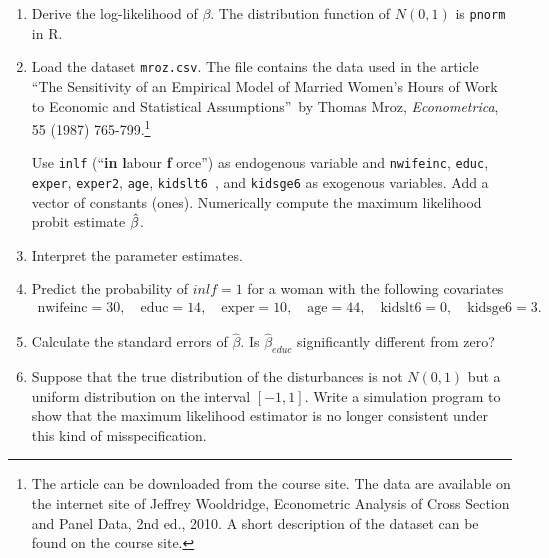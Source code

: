 \documentclass{article}
\begin{document}
\begin{enumerate}\setlength{\itemsep}{0pt}
\item Derive the log-likelihood of $\beta $. The distribution function of $%
N(0,1)$ is \texttt{pnorm} in R.

\item Load the dataset \texttt{mroz.csv}. The file contains the data used in
the article \textquotedblleft The Sensitivity of an Empirical Model of
Married Women's Hours of Work to Economic and Statistical
Assumptions\textquotedblright\ by Thomas Mroz, \emph{Econometrica}, 55
(1987) 765-799.\footnote{%
The article can be downloaded from the course site. The data are available
on the internet site of Jeffrey Wooldridge, Econometric Analysis of Cross
Section and Panel Data, 2nd ed., 2010. A short description of the dataset
can be found on the course site.}

Use \texttt{inlf} (\textquotedblleft \textbf{in} \textbf{l}abour \textbf{f}%
orce\textquotedblright ) as endogenous variable and \texttt{nwifeinc},
\texttt{educ}, \texttt{exper}, \texttt{exper2}, \texttt{age}, \texttt{kidslt6%
}, and \texttt{kidsge6} as exogenous variables. Add a vector of constants
(ones). Numerically compute the maximum likelihood probit estimate $\hat{%
\beta}$.

\item Interpret the parameter estimates.

\item Predict the probability of $inlf=1$ for a woman with the following
covariates%
\begin{eqnarray*}
\text{nwifeinc} =30, \quad
\text{educ} =14, \quad
\text{exper} =10, \quad
\text{age} =44, \quad
\text{kidslt6} =0, \quad
\text{kidsge6} =3.
\end{eqnarray*}

\item Calculate the standard errors of $\hat{\beta}$. Is $\hat{\beta}_{educ}$
significantly different from zero?

\item Suppose that the true distribution of the disturbances is not $N(0,1)$
but a uniform distribution on the interval $[-1,1]$. Write a simulation
program to show that the maximum likelihood estimator is no longer
consistent under this kind of misspecification.
\end{enumerate}
\end{document}
